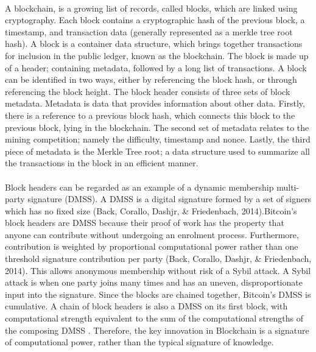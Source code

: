 \paragraph{}A blockchain, is a growing list of records, called blocks, which are linked using cryptography. Each block contains a cryptographic hash of the previous block, a timestamp, and transaction data (generally represented as a merkle tree root hash).
A block is a container data structure, which brings together transactions for inclusion in the public ledger, known as the blockchain. The block is made up of a header; containing metadata, followed by a long list of transactions. A block can be identified in two ways, either by referencing the block hash, or through referencing the block height. The block header consists of three sets of block metadata. Metadata is data that provides information about other data. Firstly, there is a reference to a previous block hash, which connects this block to the previous block, lying in the blockchain. The second set of metadata relates to the mining competition; namely the difficulty, timestamp and nonce. Lastly, the third piece of metadata is the Merkle Tree root; a data structure used to summarize all the transactions in the block in an efficient manner.
\paragraph{}Block headers can be regarded as an example of a dynamic membership multi-party signature (DMSS). A DMSS is a digital signature formed by a set of signers which has no fixed size (Back, Corallo, Dashjr, & Friedenbach, 2014).Bitcoin’s block headers are DMSS because their proof of work has the property that anyone can contribute without undergoing an enrolment process. Furthermore, contribution is weighted by proportional computational power rather than one threshold signature contribution per party (Back, Corallo, Dashjr, & Friedenbach, 2014). This allows anonymous membership without risk of a Sybil attack. A Sybil attack is when one party joins many times and has an uneven, disproportionate input into the signature. Since the blocks are chained together, Bitcoin’s DMSS is cumulative. A chain of block headers is also a DMSS on its first block, with computational strength equivalent to the sum of the computational strengths of the composing DMSS . Therefore, the key innovation in Blockchain is a signature of computational power, rather than the typical signature of knowledge.

